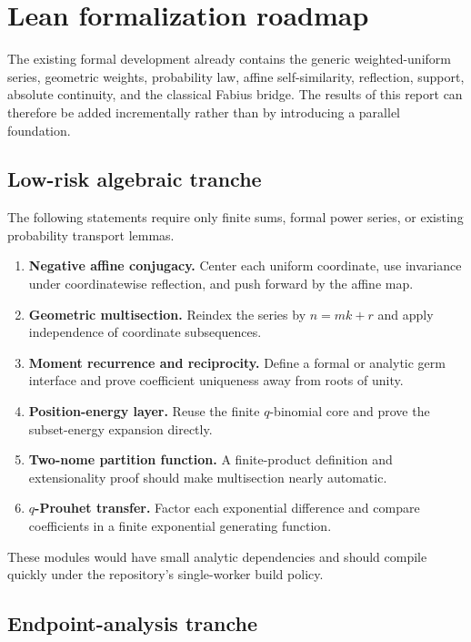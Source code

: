 \documentclass[11pt,oneside]{article}
\numberwithin{equation}{section}
\theoremstyle{definition}
\theoremstyle{remark}
\begin{document}
\section{Lean formalization roadmap}
\label{sec:lean-roadmap}

The existing formal development already contains the generic weighted-uniform
series, geometric weights, probability law, affine self-similarity, reflection,
support, absolute continuity, and the classical Fabius bridge.  The results of
this report can therefore be added incrementally rather than by introducing a
parallel foundation.

\subsection{Low-risk algebraic tranche}

The following statements require only finite sums, formal power series, or
existing probability transport lemmas.
\begin{enumerate}
\item \textbf{Negative affine conjugacy.}  Center each uniform coordinate,
      use invariance under coordinatewise reflection, and push forward by the
      affine map.
\item \textbf{Geometric multisection.}  Reindex the series by
      $n=mk+r$ and apply independence of coordinate subsequences.
\item \textbf{Moment recurrence and reciprocity.}  Define a formal or analytic
      germ interface and prove coefficient uniqueness away from roots of unity.
\item \textbf{Position-energy layer.}  Reuse the finite $q$-binomial core and
      prove the subset-energy expansion directly.
\item \textbf{Two-nome partition function.}  A finite-product definition and
      extensionality proof should make multisection nearly automatic.
\item \textbf{$q$-Prouhet transfer.}  Factor each exponential difference and
      compare coefficients in a finite exponential generating function.
\end{enumerate}
These modules would have small analytic dependencies and should compile
quickly under the repository's single-worker build policy.

\subsection{Endpoint-analysis tranche}
\end{document}
